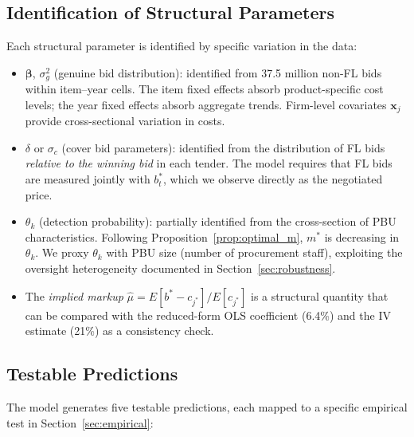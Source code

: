 
\subsection{Identification of Structural Parameters}
\label{sec:identification}

Each structural parameter is identified by specific variation in the
data:

\begin{itemize}
  \item $\boldsymbol{\beta}$, $\sigma_g^2$ (genuine bid distribution):
    identified from 37.5 million non-FL bids within item--year cells.
    The item fixed effects absorb product-specific cost levels; the year
    fixed effects absorb aggregate trends. Firm-level covariates
    $\mathbf{x}_j$ provide cross-sectional variation in costs.

  \item $\delta$ or $\sigma_c$ (cover bid parameters): identified from
    the distribution of FL bids \emph{relative to the winning bid} in
    each tender. The model requires that FL bids are measured jointly
    with $b^*_t$, which we observe directly as the negotiated price.

  \item $\theta_k$ (detection probability): partially identified from
    the cross-section of PBU characteristics. Following
    Proposition~\ref{prop:optimal_m}, $m^*$ is decreasing in
    $\theta_k$. We proxy $\theta_k$ with PBU size (number of
    procurement staff), exploiting the oversight heterogeneity
    documented in Section~\ref{sec:robustness}.

  \item The \emph{implied markup}
    $\hat{\mu} = E[b^* - c_{j^*}] / E[c_{j^*}]$ is a structural
    quantity that can be compared with the reduced-form OLS coefficient
    (6.4\%) and the IV estimate (21\%) as a consistency check.
\end{itemize}


\subsection{Testable Predictions}
\label{sec:predictions}

The model generates five testable predictions, each mapped to a specific
empirical test in Section~\ref{sec:empirical}:

